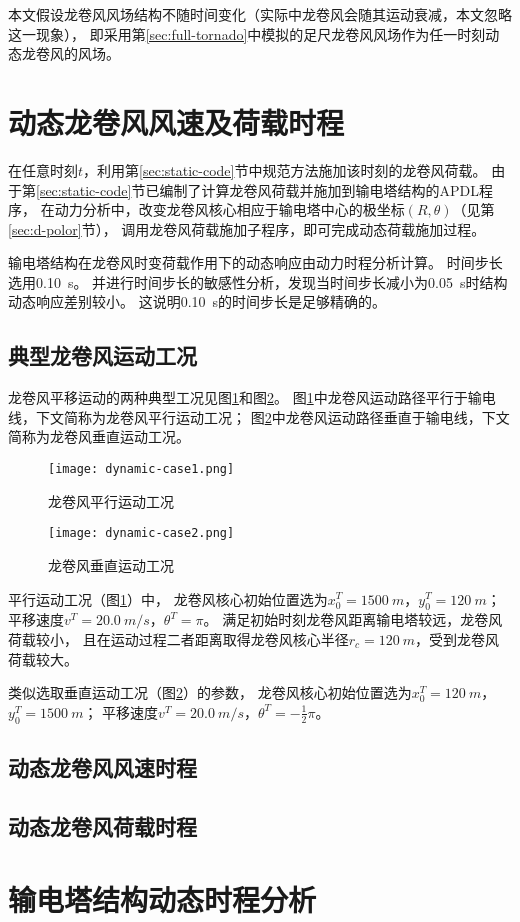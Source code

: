 本文假设龙卷风风场结构不随时间变化（实际中龙卷风会随其运动衰减，本文忽略这一现象），
即采用第\ref{sec:full-tornado}中模拟的足尺龙卷风风场作为任一时刻动态龙卷风的风场。

\section{动态龙卷风风速及荷载时程}

在任意时刻$t$，利用第\ref{sec:static-code}节中规范方法施加该时刻的龙卷风荷载。
由于第\ref{sec:static-code}节已编制了计算龙卷风荷载并施加到输电塔结构的APDL程序，
在动力分析中，改变龙卷风核心相应于输电塔中心的极坐标$(R,\theta)$（见第\ref{sec:d-polor}节），
调用龙卷风荷载施加子程序，即可完成动态荷载施加过程。

输电塔结构在龙卷风时变荷载作用下的动态响应由动力时程分析计算。
时间步长选用\SI{0.10}{s}。
并进行时间步长的敏感性分析，发现当时间步长减小为\SI{0.05}{s}时结构动态响应差别较小。
这说明\SI{0.10}{s}的时间步长是足够精确的。

\subsection{典型龙卷风运动工况}

龙卷风平移运动的两种典型工况见图\ref{fig:dynamic-case1}和图\ref{fig:dynamic-case2}。
图\ref{fig:dynamic-case1}中龙卷风运动路径平行于输电线，下文简称为龙卷风平行运动工况；
图\ref{fig:dynamic-case2}中龙卷风运动路径垂直于输电线，下文简称为龙卷风垂直运动工况。

\begin{figure}[!htpb]
    \centering
    \texttt{[image: dynamic-case1.png]}
    \caption{龙卷风平行运动工况}
    \label{fig:dynamic-case1}
\end{figure}
\begin{figure}[!htpb]
    \centering
    \texttt{[image: dynamic-case2.png]}
    \caption{龙卷风垂直运动工况}
    \label{fig:dynamic-case2}
\end{figure}

平行运动工况（图\ref{fig:dynamic-case1}）中，
龙卷风核心初始位置选为$x_0^T=\SI{1500}{m}$，$y_0^T=\SI{120}{m}$；
平移速度$v^T=\SI{20.0}{m/s}$，$\theta^T=\pi$。
满足初始时刻龙卷风距离输电塔较远，龙卷风荷载较小，
且在运动过程二者距离取得龙卷风核心半径$r_c=\SI{120}{m}$，受到龙卷风荷载较大。

类似选取垂直运动工况（图\ref{fig:dynamic-case2}）的参数，
龙卷风核心初始位置选为$x_0^T=\SI{120}{m}$，$y_0^T=\SI{1500}{m}$；
平移速度$v^T=\SI{20.0}{m/s}$，$\theta^T=-\frac{1}{2}\pi$。

\subsection{动态龙卷风风速时程}

\subsection{动态龙卷风荷载时程}

\section{输电塔结构动态时程分析}
